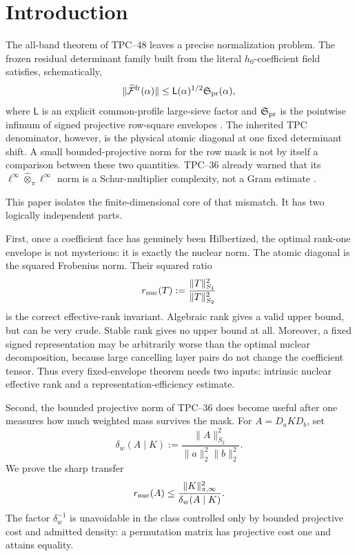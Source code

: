 \section{Introduction}
\label{sec:tpc49-introduction}

The all-band theorem of TPC--48 leaves a precise normalization problem.
The frozen residual determinant family built from the literal
\(h_0\)-coefficient field satisfies, schematically,
\begin{equation}
 \|\widehat{\mathcal F}^{\rm fr}(\alpha)\|
 \le \mathsf L(\alpha)^{1/2}
      \mathfrak S_{\rm pr}(\alpha),
 \label{eq:tpc49-inherited-reduction-schematic}
\end{equation}
where \(\mathsf L\) is an explicit common-profile large-sieve factor
and \(\mathfrak S_{\rm pr}\) is the pointwise infimum of signed
projective row-square envelopes \citep{WangTPC48}.  The inherited TPC
denominator, however, is the physical atomic diagonal at one fixed
determinant shift.  A small bounded-projective norm for the row mask is
not by itself a comparison between these two quantities.  TPC--36
already warned that its
\(\ell^\infty\widehat\otimes_\pi\ell^\infty\) norm is a Schur-multiplier
complexity, not a Gram estimate \citep{WangTPC36}.

This paper isolates the finite-dimensional core of that mismatch.  It
has two logically independent parts.

First, once a coefficient face has genuinely been Hilbertized, the
optimal rank-one envelope is not mysterious: it is exactly the nuclear
norm.  The atomic diagonal is the squared Frobenius norm.  Their squared
ratio
\begin{equation}
 r_{\rm nuc}(T)
 :=\frac{\|T\|_{S_1}^2}{\|T\|_{S_2}^2}
 \label{eq:tpc49-intro-nuclear-rank}
\end{equation}
is the correct effective-rank invariant.  Algebraic rank gives a valid
upper bound, but can be very crude.  Stable rank gives no upper bound at
all.  Moreover, a fixed signed representation may be arbitrarily worse
than the optimal nuclear decomposition, because large cancelling layer
pairs do not change the coefficient tensor.  Thus every fixed-envelope
theorem needs two inputs: intrinsic nuclear effective rank and a
representation-efficiency estimate.

Second, the bounded projective norm of TPC--36 does become useful after
one measures how much weighted mass survives the mask.  For
\(A=D_aKD_b\), set
\begin{equation}
 \delta_w(A\mid K)
 :=\frac{\|A\|_{S_2}^2}
 {\|a\|_2^2\|b\|_2^2}.
 \label{eq:tpc49-intro-weighted-density}
\end{equation}
We prove the sharp transfer
\begin{equation}
 r_{\rm nuc}(A)
 \le \frac{\|K\|_{\pi,\infty}^2}{\delta_w(A\mid K)}.
 \label{eq:tpc49-intro-density-transfer}
\end{equation}
The factor \(\delta_w^{-1}\) is unavoidable in the class controlled
only by bounded projective cost and admitted density: a permutation
matrix has projective cost one and attains equality.

